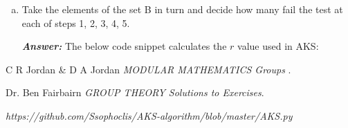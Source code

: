 \documentclass[11pt,a4paper]{article}
\begin{document}
\begin{enumerate}[1.]
\begin{enumerate}[4.]
\begin{enumerate}[(a)]
\begin{lstlisting}[
			style={mystyle},
			caption={AKS Algoritm},
			label={aks-algorithm}
			]
				true
			}
		\end{lstlisting}
		\bigbreak
		\item Take the elements of the set B in turn and decide how many fail the test at each of steps 1, 2, 3, 4, 5.
		\begin{flushleft}
			\textbf{\textit{Answer:}} The below code snippet calculates the $r$ value used in AKS:
			
		\end{flushleft}
		\end{enumerate}
	\end{enumerate}
	
\end{enumerate}
	
	\begin{thebibliography}{unsrt}
		
		C R Jordan \& D A Jordan \emph{MODULAR MATHEMATICS Groups }.
		
		Dr. Ben Fairbairn \emph{GROUP THEORY Solutions to Exercises}.
		
		\emph{https://github.com/Ssophoclis/AKS-algorithm/blob/master/AKS.py}
		
	\end{thebibliography}
	
\end{document}
